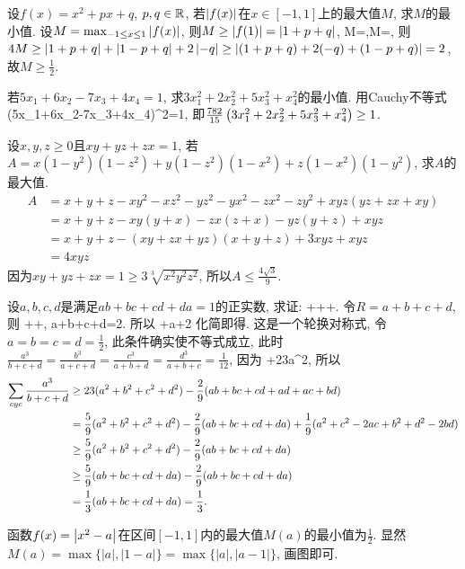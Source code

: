 \bq{}{}
设$f(x)=x^2+px+q$, $p,q\in\mathbb{R}$, 若$\left\lvert f(x)\right\rvert$在$x\in[-1,1]$上的最大值$M$, 求$M$的最小值.
\eq
\ba
设$M=\max_{-1\le x\le 1}\left\lvert f(x)\right\rvert$, 则$M\ge\left\lvert f(1)\right\rvert=\left\lvert1+p+q\right\rvert$,
\bee
M\ge{}=,\quad M\ge{}=,
\eee
则$4M\ge\left\lvert1+p+q\right\rvert+\left\lvert1-p+q\right\rvert+2\left\lvert-q\right\rvert\ge\left\lvert(1+p+q)+2(-q)+(1-p+q)\right\rvert=2$, 故$M\ge\frac12$.
\ea

\bq{}{}
若$5x_1+6x_2-7x_3+4x_4=1$, 求$3x_1^2+2x_2^2+5x_3^2+x_4^2$的最小值.
\eq
\ba
用Cauchy不等式
\bee
{}
  \ge(5x_1+6x_2-7x_3+4x_4)^2=1,
\eee
即$\frac{782}{15}\left(3x_1^2+2x_2^2+5x_3^2+x_4^2\right)\ge1$.
\ea

\bq{}{}
设$x,y,z\ge0$且$xy+yz+zx=1$, 若$A=x(1-y^2)(1-z^2)+y(1-z^2)(1-x^2)+z(1-x^2)(1-y^2)$, 求$A$的最大值.
\eq
\ba
\begin{align*}
 A&=x+y+z-xy^2-xz^2-yz^2-yx^2-zx^2-zy^2+xyz(yz+zx+xy)\\
  &=x+y+z-xy(y+x)-zx(z+x)-yz(y+z)+xyz\\
  &=x+y+z-(xy+zx+yz)(x+y+z)+3xyz+xyz\\
  &=4xyz
\end{align*}
因为$xy+yz+zx=1\ge3\sqrt[3]{x^2y^2z^2}$, 所以$A\le\frac{4\sqrt{3}}{9}$.
\ea

\bq{}{}
设$a,b,c,d$是满足$ab+bc+cd+da=1$的正实数, 求证:
\bee
{}+++\ge{}.
\eee
\eq
\ba
令$R=a+b+c+d$, 则
\bee
{}++\ge{}, \quad a+b+c+d=2.
\eee
所以
\bee
\sumcyc{}+\sumcyc a\ge\sumcyc{}+2
\eee
化简即得.
\ea
\ba
这是一个轮换对称式, 令$a=b=c=d=\frac12$, 此条件确实使不等式成立, 此时$\frac{a^3}{b+c+d}=\frac{b^3}{a+c+d}=\frac{c^3}{a+b+d}=\frac{d^3}{a+b+c}=\frac1{12}$,
因为
\bee
{}+\ge\frac23a^2,
\eee
所以
\begin{align*}
\sum\limits_{cyc}\frac{a^3}{b+c+d}&\ge23(a^2+b^2+c^2+d^2)-\frac29(ab+bc+cd+ad+ac+bd)\\
  &=\frac59(a^2+b^2+c^2+d^2)-\frac29(ab+bc+cd+da)+\frac19(a^2+c^2-2ac+b^2+d^2-2bd)\\
  &\ge\frac59(a^2+b^2+c^2+d^2)-\frac29(ab+bc+cd+da)\\
  &\ge\frac59(ab+bc+cd+da)-\frac29(ab+bc+cd+da)\\
  &=\frac13(ab+bc+cd+da)=\frac13.
\end{align*}
\ea

\bq{}{}
函数$f(x)=\left\lvert x^2-a\right\rvert$在区间$[-1,1]$内的最大值$M(a)$的最小值为\underline{$\frac12$}.
\eq
\ba
显然$M(a)=\max\{|a|,|1-a|\}=\max\{|a|,|a-1|\}$, 画图即可.
\ea

